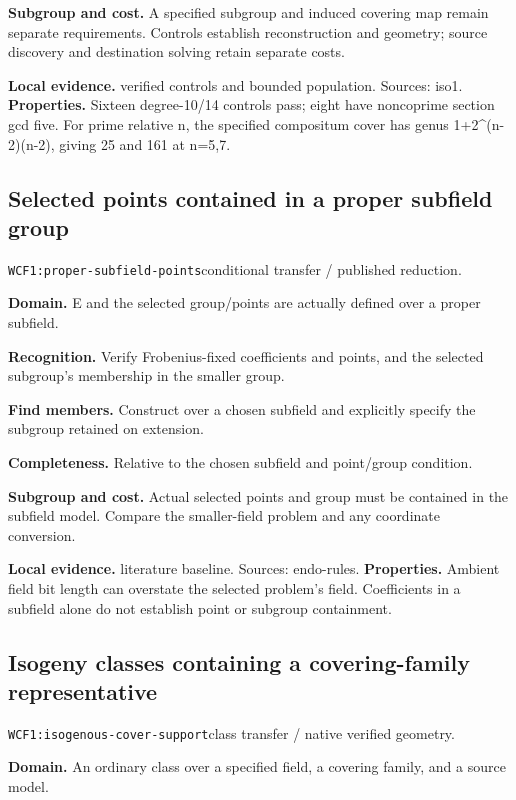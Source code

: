 \documentclass[10pt]{article}
\begin{document}
\textbf{Subgroup and cost.} A specified subgroup and induced covering map remain separate requirements. Controls establish reconstruction and geometry; source discovery and destination solving retain separate costs.\par
\textbf{Local evidence.} verified controls and bounded population. Sources: iso1.
\textbf{Properties.} Sixteen degree-10/14 controls pass; eight have noncoprime section gcd five. For prime relative n, the specified compositum cover has genus 1+2\textasciicircum{}(n-2)(n-2), giving 25 and 161 at n=5,7.\par
{}\subsection{Selected points contained in a proper subfield group}
\texttt{WCF1:proper-subfield-points}\quad conditional transfer / published reduction.\par
\textbf{Domain.} E and the selected group/points are actually defined over a proper subfield.\par
\textbf{Recognition.} Verify Frobenius-fixed coefficients and points, and the selected subgroup's membership in the smaller group.\par
\textbf{Find members.} Construct over a chosen subfield and explicitly specify the subgroup retained on extension.\par
\textbf{Completeness.} Relative to the chosen subfield and point/group condition.\par
\textbf{Subgroup and cost.} Actual selected points and group must be contained in the subfield model. Compare the smaller-field problem and any coordinate conversion.\par
\textbf{Local evidence.} literature baseline. Sources: endo-rules.
\textbf{Properties.} Ambient field bit length can overstate the selected problem's field. Coefficients in a subfield alone do not establish point or subgroup containment.\par
{}\subsection{Isogeny classes containing a covering-family representative}
\texttt{WCF1:isogenous-cover-support}\quad class transfer / native verified geometry.\par
\textbf{Domain.} An ordinary class over a specified field, a covering family, and a source model.\par
\end{document}
